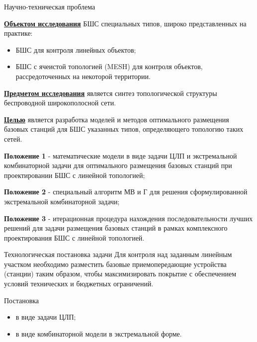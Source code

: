 \begin{frame}
    {Научно-техническая проблема}

    \textbf{\underline{Объектом исследования}} БШС специальных типов, широко представленных на практике:
    
    \bigskip

    \begin{itemize}
        \item БШС для контроля линейных объектов;
        \item БШС с ячеистой топологией (MESH) для контроля объектов, рассредоточенных на некоторой территории.
    \end{itemize}

    \bigskip

    \textbf{\underline{Предметом исследования}} является синтез топологической структуры беспроводной широкополосной сети.

    \bigskip
    
    \textbf{\underline{Целью}} является разработка моделей и методов оптимального размещения базовых станций для БШС указанных типов, определяющего топологию таких сетей.
\end{frame}

\begin{frame}
    \justifying
    \begin{center}
        {\textbf{Положение 1} - математические модели в виде задачи ЦЛП и экстремальной комбинаторной задачи для оптимального размещения базовых станций при проектировании БШС с линейной топологией;}
        \bigskip
        
        {\textbf{Положение 2} - специальный алгоритм МВ и Г для решения сформулированной
        экстремальной комбинаторной задачи;}
        \bigskip

        {\textbf{Положение 3} - итерационная процедура нахождения последовательности лучших
        решений для задачи размещения базовых станций в рамках комплексного
        проектирования БШС с линейной топологией.}
    \end{center}
\end{frame}

\begin{frame}
    {Технологическая постановка задачи} 
    \justifying
    Для контроля над заданным линейным участком необходимо разместить базовые приемопередающие устройства (станции) таким образом, чтобы максимизировать покрытие с обеспечением условий технических и бюджетных ограничений. 

    \bigskip
    
    Постановка
    \begin{itemize}
        \item в виде задачи ЦЛП;
        \item в виде комбинаторной модели в экстремальной форме.
    \end{itemize}

\end{frame}

